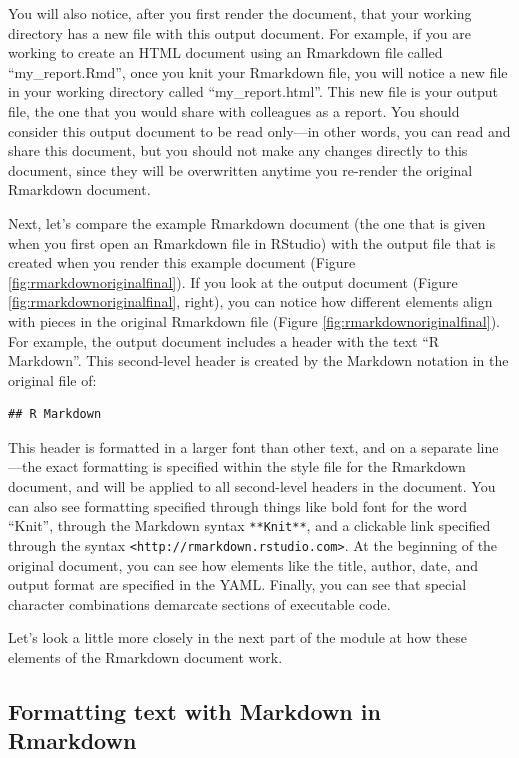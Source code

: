 \documentclass[]{tufte-book}
\begin{document}
You will also notice, after you first render the document, that your working
directory has a new file with this output document. For example, if you are
working to create an HTML document using an Rmarkdown file called
``my\_report.Rmd'', once you knit your Rmarkdown file, you will notice a new file
in your working directory called ``my\_report.html''. This new file is your output
file, the one that you would share with colleagues as a report. You should
consider this output document to be read only---in other words, you can read and
share this document, but you should not make any changes directly to this
document, since they will be overwritten anytime you re-render the original
Rmarkdown document.

Next, let's compare the example Rmarkdown document (the one that is given when
you first open an Rmarkdown file in RStudio) with the output file that is
created when you render this example document (Figure
\ref{fig:rmarkdownoriginalfinal}). If you look at the output document (Figure
\ref{fig:rmarkdownoriginalfinal}, right), you can notice how different elements
align with pieces in the original Rmarkdown file (Figure
\ref{fig:rmarkdownoriginalfinal}). For example, the output document includes a
header with the text ``R Markdown''. This second-level header is created by the
Markdown notation in the original file of:

\begin{verbatim}
## R Markdown
\end{verbatim}

This header is formatted in a larger font than other text, and on a separate
line---the exact formatting is specified within the style file for the Rmarkdown
document, and will be applied to all second-level headers in the document. You
can also see formatting specified through things like bold font for the word
``Knit'', through the Markdown syntax \texttt{**Knit**}, and a clickable link specified
through the syntax \texttt{\textless{}http://rmarkdown.rstudio.com\textgreater{}}. At the beginning of the
original document, you can see how elements like the title, author, date, and
output format are specified in the YAML. Finally, you can see that special
character combinations demarcate sections of executable code.

Let's look a little more closely in the next part of the module at how these
elements of the Rmarkdown document work.

\subsection{Formatting text with Markdown in Rmarkdown}\label{formatting-text-with-markdown-in-rmarkdown}
\end{document}
